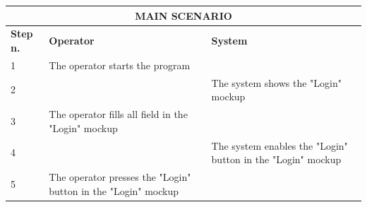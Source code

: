 {{{			\begin{table}[h]
			\begin{tabular}{|p{1cm}|p{6cm}|p{6cm}|}
			\hline
				\multicolumn{3}{|c|}{MAIN SCENARIO} \\
			\hline
				\centering \vspace{1mm} \bfseries{Step n.} \vspace{1mm} & \vspace{1mm} \bfseries{Operator} \vspace{1mm} & \vspace{1mm} \bfseries{System} \vspace{1mm}\\
			\hline
				\vspace{1mm} 1 \vspace{1mm} &
				\vspace{1mm} The operator starts the program \vspace{1mm} & 
				\vspace{1mm} \vspace{1mm} \\
			\hline
				\vspace{1mm} 2 \vspace{1mm} &
				\vspace{1mm} \vspace{1mm} & 
				\vspace{1mm} The system shows the "Login" mockup\vspace{1mm} \\
			\hline
				\vspace{1mm} 3 \vspace{1mm} &
				\vspace{1mm} The operator fills all field in the "Login" mockup \vspace{1mm} & 
				\vspace{1mm} \vspace{1mm} \\
			\hline
				\vspace{1mm} 4 \vspace{1mm} &
				\vspace{1mm} \vspace{1mm} & 
				\vspace{1mm} The system enables the "Login" button in the "Login" mockup \vspace{1mm} \\
			\hline
				\vspace{1mm} 5 \vspace{1mm} &
				\vspace{1mm} The operator presses the "Login" button in the "Login" mockup \vspace{1mm} & 

\end{tabular}
\end{table}}}}
